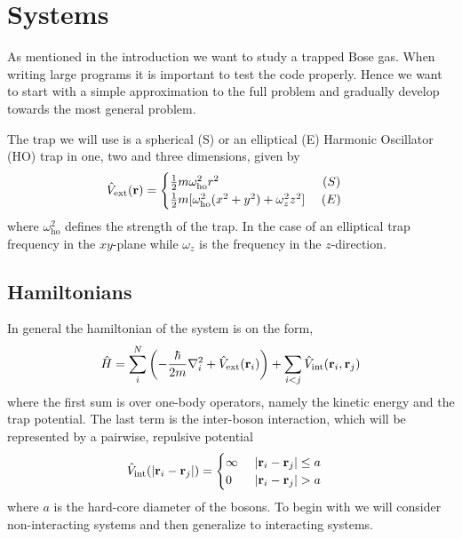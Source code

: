 \documentclass[a4paper,10pt]{article}
\begin{document}
\section{Systems} \label{Systems}
As mentioned in the introduction we want to study a trapped Bose gas. When writing large programs it is
important to test the code properly. Hence we want to start with a simple approximation to the full problem and gradually develop towards the 
most general problem.

The trap we will use is a spherical (S) or an elliptical (E) Harmonic Oscillator (HO) trap in one, two and three dimensions, given by 
\begin{equation}
 \hat{V}_{\text{ext}}({\bf r}) =
 \begin{cases} 
  \frac{1}{2}m\omega_{\text{ho}}^2r^2 \ \ \ \ \ \ \ \ \ \ \ \ \ \ \ \ \ \ \ \ \ \ \ \ \  (S) \\
  \frac{1}{2}m[\omega_{\text{ho}}^2(x^2 + y^2) + \omega_{z}^2 z^2] \ \ \ \ (E)
 \end{cases}
\end{equation}
where $\omega_{\text{ho}}^2$ defines the strength of the trap. In the case of an elliptical trap frequency in the $xy$-plane while $\omega_z$ is 
the frequency in the $z$-direction.

\subsection{Hamiltonians}
In general the hamiltonian of the system is on the form,
\begin{equation}
 \hat{H} = \sum_i^N \left(-\frac{\hbar}{2m} \nabla_i^2 + \hat{V}_{\text{ext}}({\bf r}_i) \right) + \sum_{i < j} \hat{V}_{\text{int}}({\bf r}_i,{\bf r}_j)
\end{equation}
where the first sum is over one-body operators, namely the kinetic energy and the trap potential. The last term is the inter-boson interaction, which will be represented 
by a pairwise, repulsive potential
\begin{equation}
 \hat{V}_{\text{int}}(|{\bf r}_i - {\bf r}_j|) = 
 \begin{cases}
  \infty \ \ \ \ |{\bf r}_i - {\bf r}_j| \leq a \\
  0 \ \ \ \ \ \, |{\bf r}_i - {\bf r}_j| > a
 \end{cases}
\end{equation}
where $a$ is the hard-core diameter of the bosons. To begin with we will consider non-interacting systems and then generalize to interacting systems.
\end{document}

